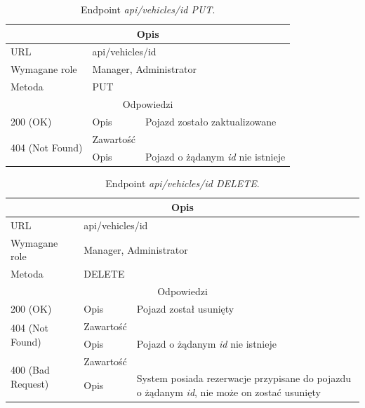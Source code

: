\documentclass[eng,printmode,openany]{mgr}
\begin{document}
	\begin{table}[H]
		\caption{Endpoint \textit{api/vehicles/id PUT}.}
		\begin{tabularx}{\textwidth}{|l|l|X|}
			\hline
			\multicolumn{3}{|c|}{Opis}
			\\ \hline
			URL                       & \multicolumn{2}{l|}{api/vehicles/id}
			\\ \hline
			Wymagane role             & \multicolumn{2}{l|}{Manager, Administrator}
			\\ \hline
			Metoda                    & \multicolumn{2}{l|}{PUT}
			\\ \hline
			\multicolumn{3}{|c|}{Odpowiedzi}
			\\ \hline
			200 (OK) 		                        & Opis      	& Pojazd zostało zaktualizowane
			\\ \hline
			\multirow{2}{*}{404 (Not Found)} 	    & Zawartość     &   
			\\ \cline{2-3}                          & Opis          & Pojazd o żądanym \textit{id} nie istnieje
			\\ \hline
		\end{tabularx}
	\end{table}
	
	\begin{table}[H]
		\caption{Endpoint \textit{api/vehicles/id DELETE}.}
		\begin{tabularx}{\textwidth}{|l|l|X|}
			\hline
			\multicolumn{3}{|c|}{Opis}
			\\ \hline
			URL                       & \multicolumn{2}{l|}{api/vehicles/id}
			\\ \hline
			Wymagane role             & \multicolumn{2}{l|}{Manager, Administrator}
			\\ \hline
			Metoda                    & \multicolumn{2}{l|}{DELETE}
			\\ \hline
			\multicolumn{3}{|c|}{Odpowiedzi}
			\\ \hline
			200 (OK)			                & Opis         	& Pojazd został usunięty
			\\ \hline
			\multirow{2}{*}{404 (Not Found)} 	& Zawartość     &    	
			\\ \cline{2-3}                      & Opis          & Pojazd o żądanym \textit{id} nie istnieje
			\\ \hline
			\multirow{2}{*}{400 (Bad Request)} 	& Zawartość     &    	
			\\ \cline{2-3}                      & Opis          & System posiada rezerwacje przypisane do pojazdu o żądanym \textit{id}, nie może on zostać usunięty
			\\ \hline
		\end{tabularx}
	\end{table}
	
\end{document}
